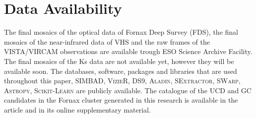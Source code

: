 \documentclass[fleqn,usenatbib]{mnras}
\begin{document}
\section*{Data Availability}
The final mosaics of the optical data of Fornax Deep Survey (FDS), the final mosaics of the near-infrared data of VHS and the raw frames of the VISTA/VIRCAM observations are available trough ESO Science Archive Facility. The final mosaics of the Ks data are not available yet, however they will be available soon. The databases, software, packages and libraries that are used throughout this paper, \textsc{SIMBAD}, \textsc{VizieR}, \textsc{DS9}, \textsc{Aladin}, \textsc{SExtractor}, \textsc{SWarp}, \textsc{Astropy}, \textsc{Scikit-Learn} are publicly available. The catalogue of the UCD and GC candidates in the Fornax cluster generated in this research is available in the article and in its online supplementary material. 










%






\bsp    %
\appendix
\end{document}
